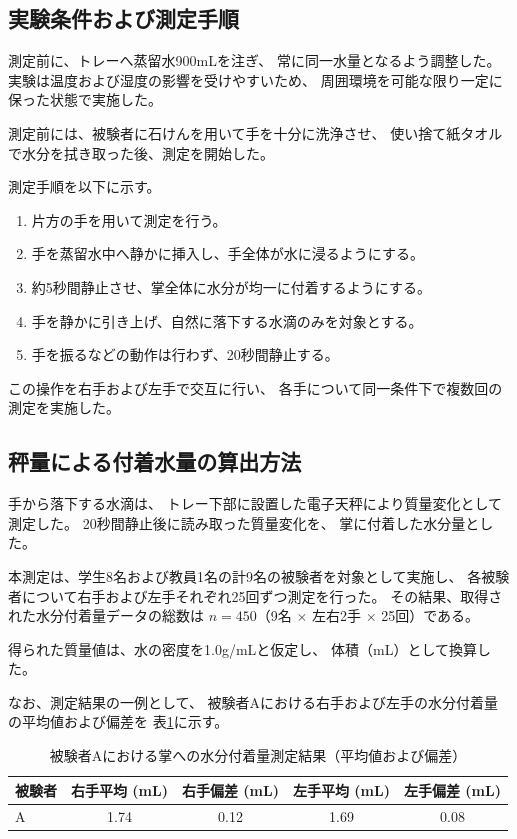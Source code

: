 \subsection{実験条件および測定手順}

測定前に、トレーへ蒸留水900mLを注ぎ、
常に同一水量となるよう調整した。
実験は温度および湿度の影響を受けやすいため、
周囲環境を可能な限り一定に保った状態で実施した。

測定前には、被験者に石けんを用いて手を十分に洗浄させ、
使い捨て紙タオルで水分を拭き取った後、測定を開始した。

測定手順を以下に示す。

\begin{enumerate}
  \item 片方の手を用いて測定を行う。
  \item 手を蒸留水中へ静かに挿入し、手全体が水に浸るようにする。
  \item 約5秒間静止させ、掌全体に水分が均一に付着するようにする。
  \item 手を静かに引き上げ、自然に落下する水滴のみを対象とする。
  \item 手を振るなどの動作は行わず、20秒間静止する。
\end{enumerate}

この操作を右手および左手で交互に行い、
各手について同一条件下で複数回の測定を実施した。

\subsection{秤量による付着水量の算出方法}
手から落下する水滴は、
トレー下部に設置した電子天秤により質量変化として測定した。
20秒間静止後に読み取った質量変化を、
掌に付着した水分量とした。

本測定は、学生8名および教員1名の計9名の被験者を対象として実施し、
各被験者について右手および左手それぞれ25回ずつ測定を行った。
その結果、取得された水分付着量データの総数は
$n = 450$（9名 $\times$ 左右2手 $\times$ 25回）である。

得られた質量値は、水の密度を1.0g/mLと仮定し、
体積（mL）として換算した。

なお、測定結果の一例として、
被験者Aにおける右手および左手の水分付着量の平均値および偏差を
表\ref{tab:water_subjectA}に示す。

\begin{table}[htbp]
  \centering
  \caption{被験者Aにおける掌への水分付着量測定結果（平均値および偏差）}
  \label{tab:water_subjectA}
  \begin{tabular}{lcccc}
    \hline
    被験者 &
    右手平均 (mL) &
    右手偏差 (mL) &
    左手平均 (mL) &
    左手偏差 (mL) \\
    \hline
    A & 1.74 & 0.12 & 1.69 & 0.08 \\
    \hline
  \end{tabular}
\end{table}

